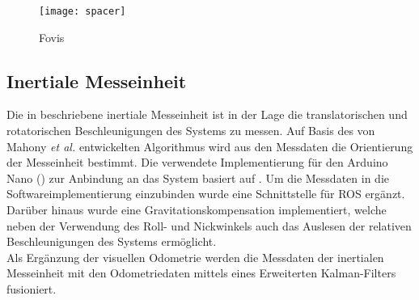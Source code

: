 \begin{figure}[!ht]
	\begin{center}
		\texttt{[image: spacer]}
		\caption{Fovis }
		\label{fig.fovis}
	\end{center}
\end{figure}

\subsection{Inertiale Messeinheit}
Die in  beschriebene inertiale Messeinheit ist in der Lage die translatorischen und rotatorischen Beschleunigungen des Systems zu messen. Auf Basis des von Mahony \textit{et al.} \cite{Mahony2008} entwickelten Algorithmus wird aus den Messdaten die Orientierung der Messeinheit bestimmt. Die verwendete Implementierung für den Arduino Nano () zur Anbindung an das System basiert auf \cite{IMUCode}. Um die Messdaten in die Softwareimplementierung einzubinden wurde eine Schnittstelle für ROS ergänzt. Darüber hinaus wurde eine Gravitationskompensation implementiert, welche neben der Verwendung des Roll- und Nickwinkels auch das Auslesen der relativen Beschleunigungen des Systems ermöglicht.\\
Als Ergänzung der visuellen Odometrie werden die Messdaten der inertialen Messeinheit mit den Odometriedaten mittels eines Erweiterten Kalman-Filters fusioniert.

